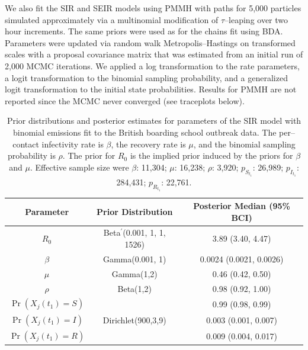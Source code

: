We also fit the SIR and SEIR models using PMMH with paths for 5,000 particles simulated approximately via a multinomial modification of $ \tau $--leaping over two hour increments. The same priors were used as for the chains fit using BDA. Parameters were updated via random walk Metropolis--Hastings on transformed scales with a proposal covariance matrix that was estimated from an initial run of 2,000 MCMC iterations. We applied a log transformation to the rate parameters, a logit transformation to the binomial sampling probability, and a generalized logit transformation to the initial state probabilities. Results for PMMH are not reported since the MCMC never converged (see traceplots below).

\begin{table}[htbp]
	\begin{center}
		\begin{tabular}{ccc}
			\hline Parameter &  Prior Distribution & Posterior Median (95\% BCI)  \\ 
			\hline
			\hline $R_0$ & Beta$ ^\prime $(0.001, 1, 1, 1526) & 3.89 (3.40, 4.47) \\
			\hline $\beta$ & Gamma(0.001, 1) & 0.0024 (0.0021, 0.0026) \\ 
			\hline $\mu$ & Gamma(1,2) & 0.46 (0.42, 0.50) \\ 
			\hline $\rho $ & Beta(1,2) & 0.98 (0.92, 1.00)\\
			\hline $\Pr(X_j(t_1) = S)$& \multirow{3}{*}{Dirichlet(900,3,9)} & 0.99 (0.98, 0.99) \\
			$\Pr(X_j(t_1) = I)$& & 0.003 (0.001, 0.007) \\
			$\Pr(X_j(t_1) = R)$&  & 0.009 (0.004, 0.017)\\
			\hline 
		\end{tabular} 
		\caption[Prior distributions for an SIR model fit to the British boarding school outbreak data.]{Prior distributions and posterior estimates for parameters of the SIR model with binomial emissions fit to the British boarding school outbreak data. The per--contact infectivity rate is $ \beta $, the recovery rate is $ \mu $, and the binomial sampling probability is $ \rho $. The prior for $ R_0 $ is the implied prior induced by the priors for $ \beta $ and $ \mu $. Effective sample size were $\beta$: 11,304; $\mu$: 16,238; $\rho$: 3,920; $p_{S_{t_1}}$: 26,989; $p_{I_{t_1}}$: 284,431; $p_{R_{t_1}}$: 22,761.}
		\label{tab:bbs_SIR_prior_binom}
	\end{center}
\end{table}

